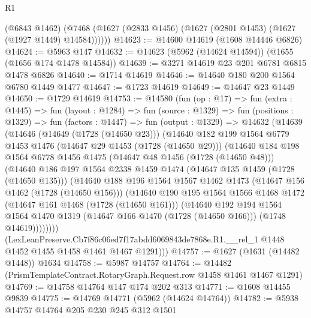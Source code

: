 \begin{lexlean}{R1}
\begin{coremodule}
        (@6843 @1462)
        (@7468 (@1627 (@2833 @1456) (@1627 (@2801 @1453) (@1627 (@1927 @1449) @14584))))))
@14623 := @14600 @14619 (@1608 @14446 @6826)
@14624 := @5963 @147
@14632 := @14623 (@5962 (@14624 @14594)) (@1655 (@1656 @174 @1478 @14584))
@14639 := @3271 @14619 @23 @201 @6781 @6815 @1478 @6826
@14640 := @1714 @14619
@14646 := @14640 @180 @200 @1564 @6780 @1449 @1477
@14647 := @1723 @14619
@14649 := @14647 @23 @1449
@14650 := @1729 @14619
@14753 := @14580
    (fun (op : @17) =>
    fun (extra : @1445) =>
    fun (layout : @1284) =>
    fun (source : @1329) =>
    fun (positions : @1329) =>
    fun (factors : @1447) =>
    fun (output : @1329) =>
    @14632
      (@14639
        (@14646
          (@14649 (@1728 (@14650 @23)))
          (@14640
            @182
            @199
            @1564
            @6779
            @1453
            @1476
            (@14647 @29 @1453 (@1728 (@14650 @29)))
            (@14640
              @184
              @198
              @1564
              @6778
              @1456
              @1475
              (@14647 @48 @1456 (@1728 (@14650 @48)))
              (@14640
                @186
                @197
                @1564
                @2338
                @1459
                @1474
                (@14647 @135 @1459 (@1728 (@14650 @135)))
                (@14640
                  @188
                  @196
                  @1564
                  @1567
                  @1462
                  @1473
                  (@14647 @156 @1462 (@1728 (@14650 @156)))
                  (@14640
                    @190
                    @195
                    @1564
                    @1566
                    @1468
                    @1472
                    (@14647 @161 @1468 (@1728 (@14650 @161)))
                    (@14640
                      @192
                      @194
                      @1564
                      @1564
                      @1470
                      @1319
                      (@14647 @166 @1470 (@1728 (@14650 @166)))
                      (@1748 @14619))))))))
        (LexLeanPreserve.Cb7f86c06ed7f17abdd6069843de7868e.R1.__rel_1
          @1448
          @1452
          @1455
          @1458
          @1461
          @1467
          @1291)))
@14757 := @1627 (@1631 (@14482 @1448)) @1634
@14758 := @5987 @14757
@14764 := @14482 (PrismTemplateContract.RotaryGraph.Request.row @1458 @1461 @1467 @1291)
@14769 := @14758 @14764 @147 @174 @202 @313
@14771 := @1608 @14455 @9839
@14775 := @14769 @14771 (@5962 (@14624 @14764))
@14782 := @5938 @14757 @14764 @205 @230 @245 @312 @1501

\end{coremodule}
\end{lexlean}
